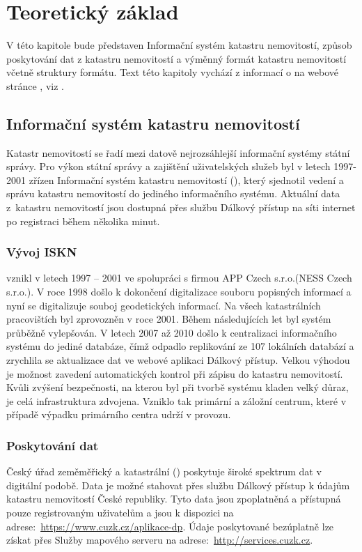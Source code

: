 \chapter{Teoretický základ}
\label{2-teorie}

V této kapitole bude představen Informační systém katastru
nemovitostí, způsob poskytování dat z katastru nemovitostí a výměnný
formát katastru nemovitostí včetně struktury formátu. Text této
kapitoly vychází z informací o  na webové stránce
, viz \cite{iskn}.

\section{Informační systém katastru nemovitostí}
Katastr nemovitostí se řadí mezi datově nejrozsáhlejší informační
systémy státní správy. Pro výkon státní správy a zajištění
uživatelských služeb byl v letech 1997-2001 zřízen Informační systém
katastru nemovitostí (), který sjednotil vedení a správu
katastru nemovitostí do jediného informačního systému. Aktuální data
z~katastru nemovitostí jsou dostupná přes službu Dálkový přístup na
síti internet po registraci během několika minut.
\subsection{Vývoj ISKN}
 vznikl v letech 1997 -- 2001 ve spolupráci s firmou APP
Czech s.r.o.(NESS Czech s.r.o.). V roce 1998 došlo k dokončení
digitalizace souboru popisných informací a nyní se digitalizuje souboj
geodetických informací. Na všech katastrálních pracovištích byl
 zprovozněn v roce 2001. Během následujících let byl systém
průběžně vylepšován. V letech 2007 až 2010 došlo k centralizaci
informačního systému do jediné databáze, čímž odpadlo replikování ze
107 lokálních databází a zrychlila se aktualizace dat ve webové
aplikaci Dálkový přístup. Velkou výhodou  je možnost zavedení
automatických kontrol při zápisu do katastru nemovitostí. Kvůli
zvýšení bezpečnosti, na kterou byl při tvorbě systému kladen velký
důraz, je celá infrastruktura zdvojena. Vzniklo tak primární a záložní
centrum, které v případě výpadku primárního centra udrží  v
provozu.
\subsection{Poskytování dat}
Český úřad zeměměřický a katastrální () poskytuje široké
spektrum dat v digitální podobě. Data je možné stahovat přes službu
Dálkový přístup k údajům katastru nemovitostí České republiky. Tyto data
jsou zpoplatněná a přístupná pouze registrovaným uživatelům a jsou k dispozici na
adrese:~\href{https://www.cuzk.cz/aplikace-dp}{https://www.cuzk.cz/aplikace-dp}. Údaje
poskytované bezúplatně lze získat přes Služby mapového serveru na
adrese:~\href{http://services.cuzk.cz/}{http://services.cuzk.cz}.

